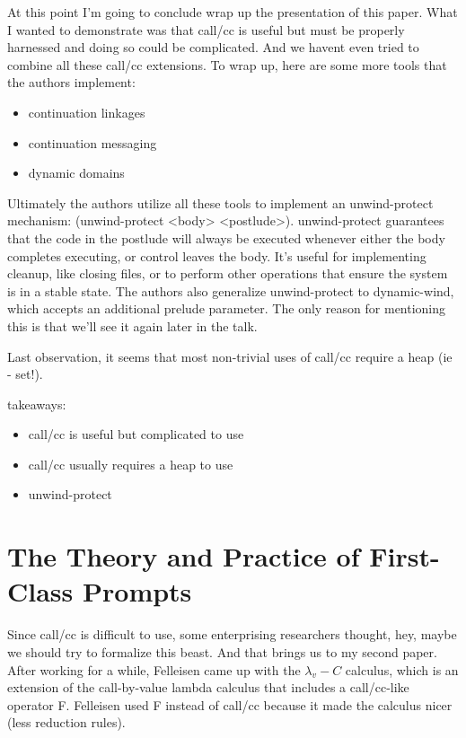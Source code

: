 \documentclass[letterpaper]{llncs}
\begin{document}
At this point I'm going to conclude wrap up the presentation of this paper. What I wanted to demonstrate was that call/cc is useful but must be properly harnessed and doing so could be complicated. And we havent even tried to combine all these call/cc extensions. To wrap up, here are some more tools that the authors implement:

\begin{itemize}
	\item continuation linkages
	\item continuation messaging
	\item dynamic domains
\end{itemize}

Ultimately the authors utilize all these tools to implement an unwind-protect mechanism: (unwind-protect <body> <postlude>). unwind-protect guarantees that the code in the postlude will always be executed whenever either the body completes executing, or control leaves the body. It's useful for implementing cleanup, like closing files, or to perform other operations that ensure the system is in a stable state. The authors also generalize unwind-protect to dynamic-wind, which accepts an additional prelude parameter. The only reason for mentioning this is that we'll see it again later in the talk.

Last observation, it seems that most non-trivial uses of call/cc require a heap (ie - set!).

takeaways:
\begin{itemize}
	\item call/cc is useful but complicated to use
	\item call/cc usually requires a heap to use
	\item unwind-protect
\end{itemize}




\section*{The Theory and Practice of First-Class Prompts}%

Since call/cc is difficult to use, some enterprising researchers thought, hey, maybe we should try to formalize this beast. And that brings us to my second paper. After working for a while, Felleisen came up with the $\lambda_v\!\!-\!\!C$ calculus, which is an extension of the call-by-value lambda calculus that includes a call/cc-like operator F. Felleisen used F instead of call/cc because it made the calculus nicer (less reduction rules).
\end{document}
